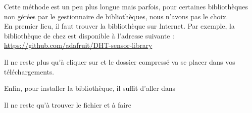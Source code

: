   Cette méthode est un peu plus longue mais parfois, pour certaines bibliothèques non gérées par le gestionnaire de bibliothèques, nous n'avons pas le choix.\\

  En premier lieu, il faut trouver la bibliothèque sur Internet. Par exemple, la bibliothèque  de chez  est disponible à l'adresse suivante : 
  \url{https://github.com/adafruit/DHT-sensor-library}

  Il ne reste plus qu'à cliquer sur  et le dossier compressé va se placer dans vos téléchargements.\\



  Enfin, pour installer la bibliothèque, il suffit d'aller dans 
  
  
  Il ne reste qu'à trouver le fichier  et à faire 
  